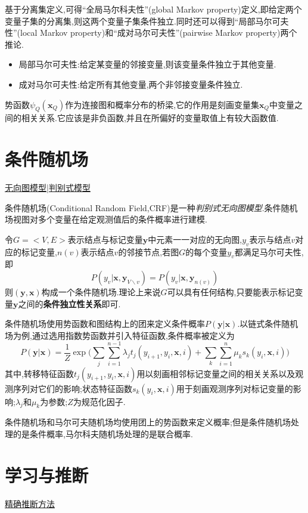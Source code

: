 基于分离集定义,可得``全局马尔科夫性''(global Markov property)定义,即给定两个变量子集的分离集,则这两个变量子集条件独立.同时还可以得到``局部马尔可夫性''(local Markov property)和``成对马尔可夫性''(pairwise Markov property)两个推论.

\begin{itemize}
\item 局部马尔可夫性:给定某变量的邻接变量,则该变量条件独立于其他变量.
\item 成对马尔可夫性:给定所有其他变量,两个非邻接变量条件独立.
\end{itemize}

势函数$\psi_Q(\bm x_Q)$作为连接图和概率分布的桥梁,它的作用是刻画变量集$\bm x_Q$中变量之间的相关关系.它应该是非负函数,并且在所偏好的变量取值上有较大函数值.

\section{条件随机场}
\underline{无向图模型|判别式模型}

条件随机场(Conditional Random Field,CRF)是一种\textit{判别式无向图模型}.条件随机场视图对多个变量在给定观测值后的条件概率进行建模.

令$G=<V,E>$表示结点与标记变量$\bm y$中元素一一对应的无向图,$y_v$表示与结点$v$对应的标记变量,$n(v)$表示结点$v$的邻接节点,若图$G$的每个变量$y_v$都满足马尔可夫性,即
\begin{equation}
P(y_v|\bm x,\bm y_{V\backslash v})=P(y_v|\bm x,\bm y_{n(v)})
\end{equation}
则$(\bm y, \bm x)$构成一个条件随机场.理论上来说$G$可以具有任何结构,只要能表示标记变量$\bm y$之间的\textbf{条件独立性关系}即可.

条件随机场使用势函数和图结构上的团来定义条件概率$P(\bm y|\bm x)$.以链式条件随机场为例,通过选用指数势函数并引入特征函数,条件概率被定义为
\begin{equation}
P(\bm y|\bm x)=\frac{1}{Z}\exp\Big(\sum_j\sum_{i=1}^{n-1}\lambda_jt_j(y_{i+1},y_i,\bm x, i)+\sum_k\sum_{i=1}^n\mu_ks_k(y_i,\bm x,i)\Big)
\end{equation}
其中,转移特征函数$t_j(y_{i+1},y_i,\bm x, i)$用以刻画相邻标记变量之间的相关关系以及观测序列对它们的影响;状态特征函数$s_k(y_i,\bm x,i)$用于刻画观测序列对标记变量的影响;$\lambda_j$和$\mu_k$为参数;$Z$为规范化因子.

条件随机场和马尔可夫随机场均使用团上的势函数来定义概率;但是条件随机场处理的是条件概率,马尔科夫随机场处理的是联合概率.

\section{学习与推断}
\underline{精确推断方法}


